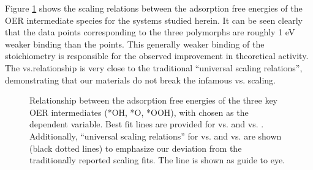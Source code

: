 %
Figure \ref{fig:scaling_relations} shows the scaling relations between the adsorption free energies of the OER intermediate species for the \IrOx systems studied herein.
%
It can be seen clearly that the data points corresponding to the three \IrOthree polymorphs are roughly 1 eV weaker binding than the \rIrOtwo points.
%
This generally weaker binding of the \IrOthree stoichiometry is responsible for the observed improvement in theoretical activity.
%
The \DGOOH vs.\DGOH relationship is very close to the traditional ``universal scaling relations'', demonstrating that our materials do not break the infamous \DGOOH vs. \DGOH scaling.


\begin{figure}[!htb]
\centering
{}
\caption{\label{fig:scaling_relations}
Relationship between the adsorption free energies of the three key OER intermediates (*OH, *O, *OOH), with \DGOH chosen as the dependent variable.
Best fit lines are provided for \DGOOH vs. \DGOH and \DGO vs. \DGOH.
%
Additionally, ``universal scaling relations'' for \DGOOH vs. \DGOH and \DGO vs. \DGOH are shown (black dotted lines) to emphasize our deviation from the traditionally reported scaling fits.
The \DGOH line is  shown as guide to eye.
}
\end{figure}

